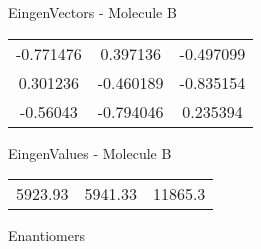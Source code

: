 \begin{multicols}{2}
\begin{center}
\vtab
 EingenVectors - Molecule B     \\
\vtab
\begin{tabular}{|c c c|}
-0.771476	 & 	0.397136	 & 	-0.497099	 \\
0.301236	 & 	-0.460189	 & 	-0.835154	 \\
-0.56043	 & 	-0.794046	 & 	0.235394
\end{tabular}

\vtab
 EingenValues - Molecule B     \\
\vtab
\begin{tabular}{|c c c|}
5923.93	 & 	5941.33	 & 	11865.3	 \\
\end{tabular}

\end{center}
\end{multicols}
\begin{center}
\vtab
\vtab
\textcolor{NavyBlue}{\Large Enantiomers}
\end{center}

 \newpage

